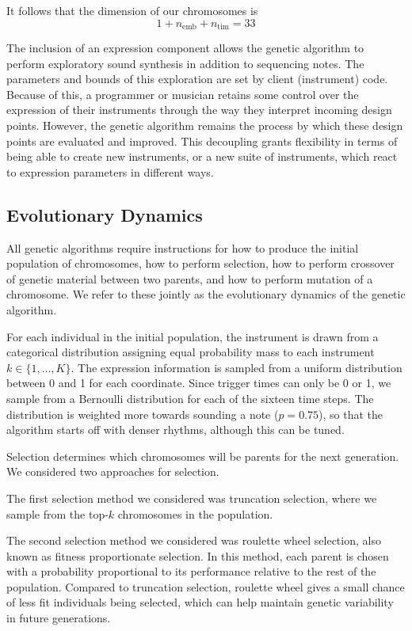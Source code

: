 \documentclass[conference]{IEEEtran}
\begin{document}
It follows that the dimension of our chromosomes is
\begin{equation}
    1 + n_\text{emb} + n_\text{tim} = 33
\end{equation}

The inclusion of an expression component allows the genetic algorithm to
perform exploratory  sound synthesis in addition to sequencing notes. The
parameters and bounds of this exploration are set by client (instrument) code.
Because of this, a programmer or musician retains some control over the
expression of their instruments through the way they interpret incoming design
points. However, the genetic algorithm remains the process by which these
design points are evaluated and improved. This decoupling grants flexibility in
terms of being able to create new instruments, or a new suite of instruments,
which react to expression parameters in different ways.

\subsection{Evolutionary Dynamics}

All genetic algorithms require instructions for how to produce the initial
population of chromosomes, how to perform selection, how to perform crossover
of genetic material between two parents, and how to perform mutation of a
chromosome. We refer to these jointly as the evolutionary dynamics of the
genetic algorithm.

For each individual in the initial population, the instrument is drawn from a
categorical distribution assigning equal probability mass to each instrument
$k \in \{1, \dots, K\}$. The expression information is sampled from a uniform
distribution between 0 and 1 for each coordinate. Since trigger times can only
be 0 or 1, we sample from a Bernoulli distribution for each of the sixteen time
steps. The distribution is weighted more towards sounding a note
($p=0.75$), so that the algorithm starts off with denser rhythms,
although this can be tuned.

Selection determines which chromosomes will be parents for the next generation.
We considered two approaches for selection.

The first selection method we considered was truncation selection, where we
sample from the top-$k$ chromosomes in the population.

The second selection method we considered was roulette wheel selection, also
known as fitness proportionate selection. In this method, each parent is chosen
with a probability proportional to its performance relative to the rest of the
population. Compared to truncation selection, roulette wheel gives a small
chance of less fit individuals being selected, which can help maintain genetic
variability in future generations.
\end{document}
